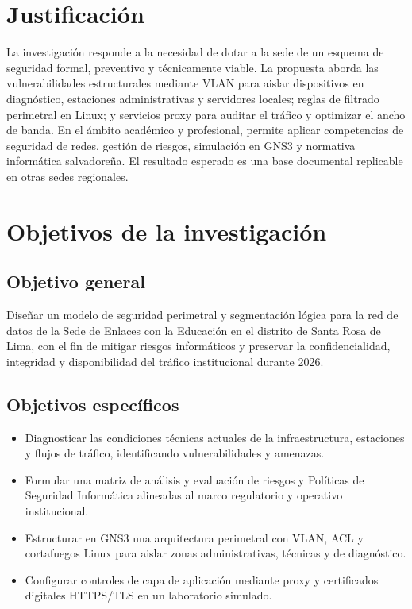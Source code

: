 \documentclass[11pt,letterpaper]{article}
\begin{document}
\section{Justificación}
La investigación responde a la necesidad de dotar a la sede de un esquema de
seguridad formal, preventivo y técnicamente viable. La propuesta aborda las
vulnerabilidades estructurales mediante VLAN para aislar dispositivos en
diagnóstico, estaciones administrativas y servidores locales; reglas de
filtrado perimetral en Linux; y servicios proxy para auditar el tráfico y
optimizar el ancho de banda. En el ámbito académico y profesional, permite
aplicar competencias de seguridad de redes, gestión de riesgos, simulación en
GNS3 y normativa informática salvadoreña. El resultado esperado es una base
documental replicable en otras sedes regionales.

\section{Objetivos de la investigación}
\subsection{Objetivo general}
Diseñar un modelo de seguridad perimetral y segmentación lógica para la red de
datos de la Sede de Enlaces con la Educación en el distrito de Santa Rosa de
Lima, con el fin de mitigar riesgos informáticos y preservar la
confidencialidad, integridad y disponibilidad del tráfico institucional durante
2026.
\subsection{Objetivos específicos}
\begin{itemize}
  \item Diagnosticar las condiciones técnicas actuales de la infraestructura,
  estaciones y flujos de tráfico, identificando vulnerabilidades y amenazas.
  \item Formular una matriz de análisis y evaluación de riesgos y Políticas de
  Seguridad Informática alineadas al marco regulatorio y operativo institucional.
  \item Estructurar en GNS3 una arquitectura perimetral con VLAN, ACL y
  cortafuegos Linux para aislar zonas administrativas, técnicas y de diagnóstico.
  \item Configurar controles de capa de aplicación mediante proxy y certificados
  digitales HTTPS/TLS en un laboratorio simulado.
\end{itemize}
\end{document}
